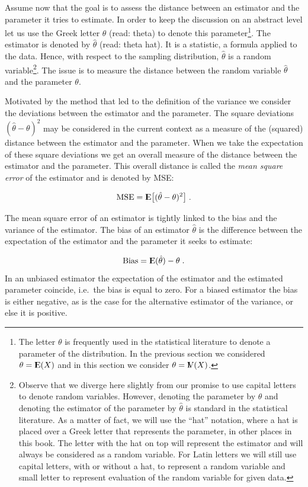 \documentclass[]{krantz}
\newcommand{\Expec}{{\rm I\kern-.3em E}}
\newcommand{\Var}{{\rm I\kern-.3em V}}
\theoremstyle{definition}
\theoremstyle{definition}
\theoremstyle{definition}
\theoremstyle{remark}
\begin{document}
Assume now that the goal is to assess the distance between an estimator
and the parameter it tries to estimate. In order to keep the discussion
on an abstract level let us use the Greek letter \(\theta\) (read: theta)
to denote this parameter\footnote{The letter \(\theta\) is frequently used in the statistical
  literature to denote a parameter of the distribution. In the
  previous section we considered \(\theta = \Expec(X)\) and in this
  section we consider \(\theta=\Var(X)\).}. The estimator is denoted by \(\hat \theta\)
(read: theta hat). It is a statistic, a formula applied to the data.
Hence, with respect to the sampling distribution, \(\hat \theta\) is a
random variable\footnote{Observe that we diverge here slightly from our promise to use
  capital letters to denote random variables. However, denoting the
  parameter by \(\theta\) and denoting the estimator of the parameter by
  \(\hat \theta\) is standard in the statistical literature. As a matter
  of fact, we will use the ``hat'' notation, where a hat is placed over
  a Greek letter that represents the parameter, in other places in
  this book. The letter with the hat on top will represent the
  estimator and will always be considered as a random variable. For
  Latin letters we will still use capital letters, with or without a
  hat, to represent a random variable and small letter to represent
  evaluation of the random variable for given data.}. The issue is to measure the distance between the
random variable \(\hat \theta\) and the parameter \(\theta\).

Motivated by the method that led to the definition of the variance we
consider the deviations between the estimator and the parameter. The
square deviations \((\hat \theta - \theta)^2\) may be considered in the
current context as a measure of the (squared) distance between the
estimator and the parameter. When we take the expectation of these
square deviations we get an overall measure of the distance between the
estimator and the parameter. This overall distance is called the \emph{mean
square error} of the estimator and is denoted by MSE:

\[\mathrm{MSE} = \Expec\big[(\hat \theta - \theta)^2\big]\;.\]

The mean square error of an estimator is tightly linked to the bias and
the variance of the estimator. The bias of an estimator \(\hat \theta\) is
the difference between the expectation of the estimator and the
parameter it seeks to estimate:

\[\mathrm{Bias} = \Expec(\hat \theta) - \theta\;.\] In an unbiased
estimator the expectation of the estimator and the estimated parameter
coincide, i.e.~the bias is equal to zero. For a biased estimator the
bias is either negative, as is the case for the alternative estimator of
the variance, or else it is positive.
\end{document}
